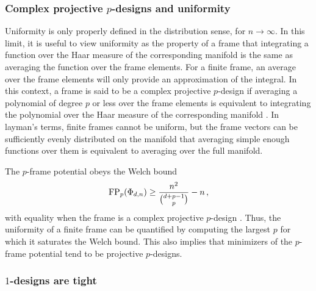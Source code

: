 \documentclass[%
superscriptaddress,
amsmath,amssymb,
 aps,
pra,
floatfix,
]{revtex4-2}
\begin{document}
\subsubsection{Complex projective $p$-designs and uniformity}

Uniformity is only properly defined in the distribution sense, for $n\to \infty$. In this limit, it is useful to view uniformity as the property of a frame that integrating a function over the Haar measure of the corresponding manifold is the same as averaging the function over the frame elements. For a finite frame, an average over the frame elements will only provide an approximation of the integral. In this context, a frame is said to be a complex projective $p$-design if averaging a polynomial of degree $p$ or less over the frame elements is equivalent to integrating the polynomial over the Haar measure of the corresponding manifold \cite{scott2006tight}. In layman's terms, finite frames cannot be uniform, but the frame vectors can be sufficiently evenly distributed on the manifold that averaging simple enough functions over them is equivalent to averaging over the full manifold.

The $p$-frame potential obeys the Welch bound
%
\begin{equation}
    {\rm FP}_p(\Phi_{d, n}) \geq \frac{n^2}{\binom{d + p - 1}{p}} - n\,,
    \label{eq:welch}
\end{equation}
%
with equality when the frame is a complex projective $p$-design \cite{welch1974lower, klappenecker2005mutually}. Thus, the uniformity of a finite frame can be quantified by computing the largest $p$ for which it saturates the Welch bound. This also implies that minimizers of the $p$-frame potential tend to be projective $p$-designs.

\subsubsection{$1$-designs are tight}
\end{document}
